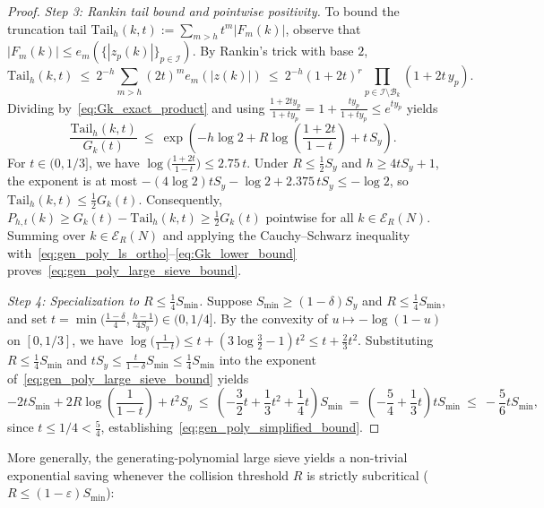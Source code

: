 \documentclass[11pt, a4paper]{article}
\theoremstyle{plain}
\theoremstyle{definition}
\begin{document}
\begin{proof}
\medskip\noindent\emph{Step 3: Rankin tail bound and pointwise positivity.}
To bound the truncation tail $\mathrm{Tail}_h(k,t):=\sum_{m>h}t^{m}|F_m(k)|$, observe that $|F_m(k)|\le e_m(\{|z_p(k)|\}_{p\in\mathcal{I}})$. By Rankin's trick with base $2$,
$$\mathrm{Tail}_h(k,t)\ \le\ 2^{-h}\sum_{m>h}(2t)^{m}e_m(|z(k)|)\ \le\ 2^{-h}(1+2t)^{r}\prod_{p\in\mathcal{I}\setminus\mathcal{B}_k}(1+2t\,y_p).$$
Dividing by~\eqref{eq:Gk_exact_product} and using $\frac{1+2ty_p}{1+ty_p}=1+\frac{ty_p}{1+ty_p}\le e^{ty_p}$ yields
$$\frac{\mathrm{Tail}_h(k,t)}{G_k(t)}\ \le\ \exp\!\left(-h\log 2+R\log\!\left(\frac{1+2t}{1-t}\right)+t\,S_y\right).$$
For $t\in(0,1/3]$, we have $\log\big(\frac{1+2t}{1-t}\big)\le 2.75\,t$. Under $R\le\frac12 S_y$ and $h\ge 4tS_y+1$, the exponent is at most $-(4\log 2)tS_y-\log 2+2.375\,tS_y\le-\log 2$, so $\mathrm{Tail}_h(k,t)\le\frac12 G_k(t)$. Consequently, $P_{h,t}(k)\ge G_k(t)-\mathrm{Tail}_h(k,t)\ge\frac12 G_k(t)$ pointwise for all $k\in\mathcal{E}_R(N)$. Summing over $k\in\mathcal{E}_R(N)$ and applying the Cauchy--Schwarz inequality with~\eqref{eq:gen_poly_ls_ortho}--\eqref{eq:Gk_lower_bound} proves~\eqref{eq:gen_poly_large_sieve_bound}.

\medskip\noindent\emph{Step 4: Specialization to $R\le\frac14 S_{\min}$.}
Suppose $S_{\min}\ge(1-\delta)S_y$ and $R\le\frac14 S_{\min}$, and set $t=\min\!\big(\frac{1-\delta}{4},\frac{h-1}{4S_y}\big)\in(0,1/4]$. By the convexity of $u\mapsto-\log(1-u)$ on $[0,1/3]$, we have $\log\!\big(\frac{1}{1-t}\big)\le t+(3\log\frac32-1)t^{2}\le t+\frac23 t^{2}$. Substituting $R\le\frac14 S_{\min}$ and $tS_y\le\frac{t}{1-\delta}S_{\min}\le\frac14 S_{\min}$ into the exponent of~\eqref{eq:gen_poly_large_sieve_bound} yields
$$-2tS_{\min}+2R\log\!\left(\frac{1}{1-t}\right)+t^{2}S_y\ \le\ \left(-\frac32 t+\frac13 t^{2}+\frac14 t\right)S_{\min}\ =\ \left(-\frac54+\frac13 t\right)tS_{\min}\ \le\ -\frac56 tS_{\min},$$
since $t\le 1/4<\frac54$, establishing~\eqref{eq:gen_poly_simplified_bound}.
\end{proof}

More generally, the generating-polynomial large sieve yields a non-trivial exponential saving whenever the collision threshold $R$ is strictly subcritical ($R\le(1-\varepsilon)S_{\min}$):
\end{document}
